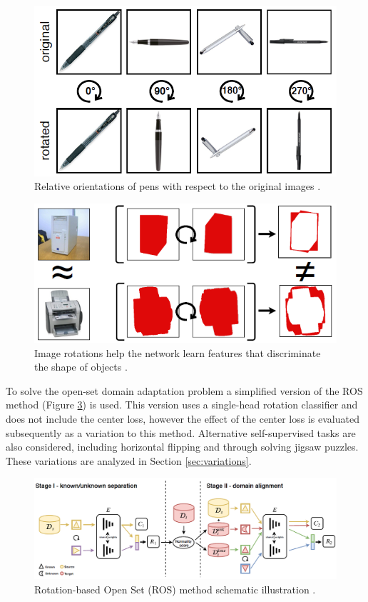 \documentclass[10pt,twocolumn,letterpaper]{article}
\begin{document}
\begin{figure}[!htb]
  \centering
   \includegraphics[width=0.9\linewidth]{Figures/RotatedPens.png}
   \caption{Relative orientations of pens with respect to the original images \cite{Bucci2020}.}
   \label{fig:RotatedPens}
\end{figure}

\begin{figure}[!htb]
  \centering
   \includegraphics[width=0.9\linewidth]{Figures/RotationFeatures.png}
   \caption{Image rotations help the network learn features that discriminate the shape of objects \cite{Bucci2020}.}
   \label{fig:RotationFeatures}
\end{figure}

To solve the open-set domain adaptation problem a simplified version of the ROS method (Figure \ref{fig:ROS}) is used. This version uses a single-head rotation classifier and does not include the center loss, however the effect of the center loss is evaluated subsequently as a variation to this method. Alternative self-supervised tasks are also considered, including horizontal flipping and through solving jigsaw puzzles. These variations are analyzed in Section \ref{sec:variations}.

\begin{figure}[!htb]
  \centering
   \includegraphics[width=0.9\linewidth]{Figures/ROS.png}
   \caption{Rotation-based Open Set (ROS) method schematic illustration \cite{Bucci2020}.}
   \label{fig:ROS}
\end{figure}
\end{document}
